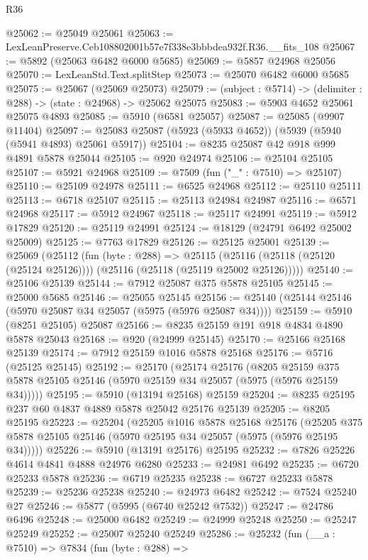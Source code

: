 \begin{lexlean}{R36}
\begin{coremodule}
@25062 := @25049 @25061
@25063 := LexLeanPreserve.Ceb108802001b57e7f338e3bbbdea932f.R36.__fits_108
@25067 := @5892 (@25063 @6482 @6000 @5685)
@25069 := @5857 @24968 @25056
@25070 := LexLeanStd.Text.splitStep
@25073 := @25070 @6482 @6000 @5685
@25075 := @25067 (@25069 @25073)
@25079 := (subject : @5714) -> (delimiter : @288) -> (state : @24968) -> @25062 @25075
@25083 := @5903 @4652 @25061 @25075 @4893
@25085 := @5910 (@6581 @25057)
@25087 := @25085 (@9907 @11404)
@25097 := @25083 @25087 (@5923 (@5933 @4652)) (@5939 (@5940 (@5941 @4893) @25061 @5917))
@25104 := @8235 @25087 @42 @918 @999 @4891 @5878 @25044
@25105 := @920 @24974
@25106 := @25104 @25105
@25107 := @5921 @24968
@25109 := @7509 (fun ("_" : @7510) => @25107)
@25110 := @25109 @24978
@25111 := @6525 @24968
@25112 := @25110 @25111
@25113 := @6718 @25107
@25115 := @25113 @24984 @24987
@25116 := @6571 @24968
@25117 := @5912 @24967
@25118 := @25117 @24991
@25119 := @5912 @17829
@25120 := @25119 @24991
@25124 := @18129 (@24791 @6492 @25002 @25009)
@25125 := @7763 @17829
@25126 := @25125 @25001
@25139 := @25069
    (@25112
      (fun (byte : @288) =>
      @25115 (@25116 (@25118 (@25120 (@25124 @25126)))) (@25116 (@25118 (@25119 @25002 @25126)))))
@25140 := @25106 @25139
@25144 := @7912 @25087 @375 @5878 @25105
@25145 := @25000 @5685
@25146 := @25055 @25145
@25156 := @25140 (@25144 @25146 (@5970 @25087 @34 @25057 (@5975 (@5976 @25087 @34))))
@25159 := @5910 (@8251 @25105) @25087
@25166 := @8235 @25159 @191 @918 @4834 @4890 @5878 @25043
@25168 := @920 (@24999 @25145)
@25170 := @25166 @25168 @25139
@25174 := @7912 @25159 @1016 @5878 @25168
@25176 := @5716 (@25125 @25145)
@25192 := @25170
    (@25174
      @25176
      (@8205 @25159 @375 @5878 @25105 @25146 (@5970 @25159 @34 @25057 (@5975 (@5976 @25159 @34)))))
@25195 := @5910 (@13194 @25168) @25159
@25204 := @8235 @25195 @237 @60 @4837 @4889 @5878 @25042 @25176 @25139
@25205 := @8205 @25195
@25223 := @25204
    (@25205
      @1016
      @5878
      @25168
      @25176
      (@25205 @375 @5878 @25105 @25146 (@5970 @25195 @34 @25057 (@5975 (@5976 @25195 @34)))))
@25226 := @5910 (@13191 @25176) @25195
@25232 := @7826 @25226 @4614 @4841 @4888 @24976 @6280
@25233 := @24981 @6492
@25235 := @6720 @25233 @5878
@25236 := @6719 @25235
@25238 := @6727 @25233 @5878
@25239 := @25236 @25238
@25240 := @24973 @6482
@25242 := @7524 @25240 @27
@25246 := @5877 (@5995 (@6740 @25242 @7532))
@25247 := @24786 @6496
@25248 := @25000 @6482
@25249 := @24999 @25248
@25250 := @25247 @25249
@25252 := @25007 @25240 @25249
@25286 := @25232
    (fun (__a : @7510) =>
    @7834
      (fun (byte : @288) =>

\end{coremodule}
\end{lexlean}
